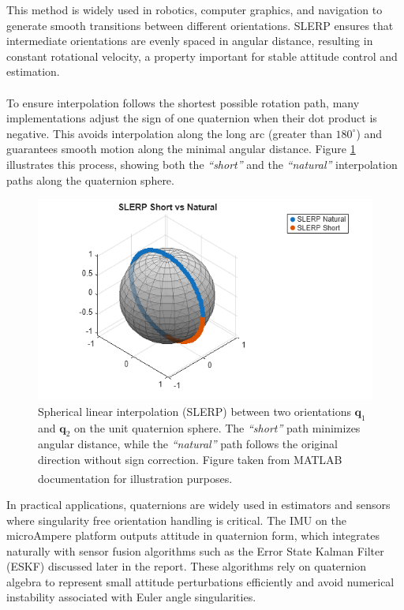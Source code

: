 This method is widely used in robotics, computer graphics, and navigation to generate smooth transitions between different orientations. SLERP ensures that intermediate orientations are evenly spaced in angular distance, resulting in constant rotational velocity, a property important for stable attitude control and estimation.  
\\ \\
To ensure interpolation follows the shortest possible rotation path, many implementations adjust the sign of one quaternion when their dot product is negative. This avoids interpolation along the long arc (greater than $180^{\circ}$) and guarantees smooth motion along the minimal angular distance. Figure \ref{fig:system-modeling-quaternion-SLERP} illustrates this process, showing both the \textit{``short''} and the \textit{``natural''} interpolation paths along the quaternion sphere.
\begin{figure}[H]
    \centering
    \includegraphics[width=0.75\linewidth]{Pictures/System_Modeling/Orientation_Representations/quaternion_SLERP.png}
    \caption{Spherical linear interpolation (SLERP) between two orientations $\mathbf{q}_1$ and $\mathbf{q}_2$ on the unit quaternion sphere. The \textit{``short''} path minimizes angular distance, while the \textit{``natural''} path follows the original direction without sign correction. Figure taken from MATLAB documentation for illustration purposes.\textsuperscript{\cite{quaternions_SLERP}}}
    \label{fig:system-modeling-quaternion-SLERP}
\end{figure}
\noindent
In practical applications, quaternions are widely used in estimators and sensors where singularity free orientation handling is critical. The IMU on the microAmpere platform outputs attitude in quaternion form, which integrates naturally with sensor fusion algorithms such as the Error State Kalman Filter (ESKF) discussed later in the report. These algorithms rely on quaternion algebra to represent small attitude perturbations efficiently and avoid numerical instability associated with Euler angle singularities.  
